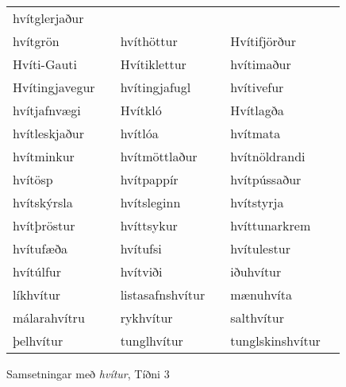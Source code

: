 \documentclass{../litmal.tex}{subfiles}
\begin{document}
\begin{wordlist}[H]
\begin{tcolorbox}
\begin{tabular}{BlBlBl}
		hvítglerjaður	&		\\ 
		hvítgrön		&		& 
		hvíthöttur	&		& 	
		Hvítifjörður	&		\\ 	
		Hvíti-Gauti	&		& 	
		Hvítiklettur	&		& 	
		hvítimaður	&		\\ 	
		Hvítingjavegur &		& 	
		hvítingjafugl	&		& 
		hvítivefur	&		\\ 
		hvítjafnvægi	&		& 
		Hvítkló		&		& 		
		Hvítlagða	&		\\ 		
		hvítleskjaður	&		& 	
		hvítlóa		&		& 	
		hvítmata		&		\\ 	
		hvítminkur	&		& 	
		hvítmöttlaður	 &		& 		
		hvítnöldrandi	 &		\\ 
		hvítösp		&		& 		
		hvítpappír	&		& 	
		hvítpússaður	&		\\ 
		hvítskýrsla	&		& 	
		hvítsleginn	&		& 	
		hvítstyrja	&		\\ 	
		hvítþröstur	&		& 
		hvíttsykur	&		& 	
		hvíttunarkrem &		\\ 	
		hvítufæða	&		& 	
		hvítufsi		&		& 	
		hvítulestur	&		\\ 
		hvítúlfur		&		& 
		hvítviði		&		& 	
		iðuhvítur		&		\\ 	
		líkhvítur		& 		& 	
		listasafnshvítur & 		& 	
		mænuhvíta	&		\\ 		
		málarahvítru	& 		& 	
		rykhvítur		&		& 		
		salthvítur	&		\\ 		
		þelhvítur		&		& 	
		tunglhvítur	&		& 
		tunglskinshvítur & 	 
	\end{tabular}
\end{tcolorbox}
	\caption{Samsetningar með \textit{hvítur}, Tíðni 3}
	\label{listi:hvitt.3}
\end{wordlist}
\end{document}

